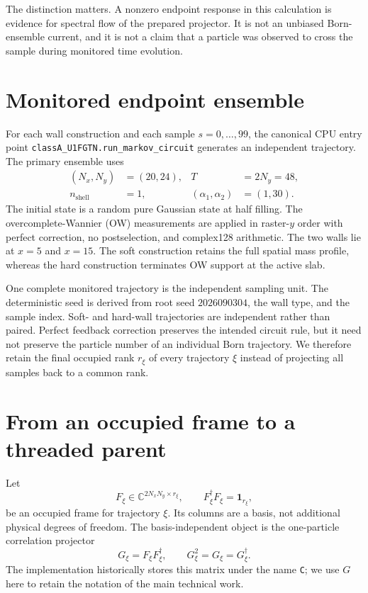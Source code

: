 \documentclass[aps,prb,twocolumn,floatfix,nofootinbib,superscriptaddress]{revtex4-2}
\begin{document}
The distinction matters.  A nonzero endpoint response in this calculation is
evidence for spectral flow of the prepared projector.  It is not an unbiased
Born-ensemble current, and it is not a claim that a particle was observed to
cross the sample during monitored time evolution.

\section{Monitored endpoint ensemble}

For each wall construction and each sample $s=0,\ldots,99$, the canonical CPU
entry point \texttt{classA\_U1FGTN.run\_markov\_circuit} generates an
independent trajectory.  The primary ensemble uses
\begin{align}
 (N_x,N_y)&=(20,24), & T&=2N_y=48,\\
 n_{\mathrm{shell}}&=1, & (\alpha_1,\alpha_2)&=(1,30).
\end{align}
The initial state is a random pure Gaussian state at half filling.  The
overcomplete-Wannier (OW) measurements are applied in raster-$y$ order with
perfect correction, no postselection, and complex128 arithmetic.  The two
walls lie at $x=5$ and $x=15$.  The soft construction retains the full spatial
mass profile, whereas the hard construction terminates OW support at the
active slab.

One complete monitored trajectory is the independent sampling unit.  The
deterministic seed is derived from root seed $2026090304$, the wall type, and
the sample index.  Soft- and hard-wall trajectories are independent rather
than paired.  Perfect feedback correction preserves the intended circuit
rule, but it need not preserve the particle number of an individual Born
trajectory.  We therefore retain the final occupied rank $r_\xi$ of every
trajectory $\xi$ instead of projecting all samples back to a common rank.

\section{From an occupied frame to a threaded parent}

Let
\begin{equation}
 F_\xi\in\mathbb C^{2N_xN_y\times r_\xi},\qquad
 F_\xi^\dagger F_\xi=\mathbf{1}_{r_\xi},
\end{equation}
be an occupied frame for trajectory $\xi$.  Its columns are a basis, not
additional physical degrees of freedom.  The basis-independent object is the
one-particle correlation projector
\begin{equation}
 G_\xi=F_\xi F_\xi^\dagger,
 \qquad G_\xi^2=G_\xi=G_\xi^\dagger .
 \label{eq:projector}
\end{equation}
The implementation historically stores this matrix under the name \texttt{C};
we use $G$ here to retain the notation of the main technical work.
\end{document}
